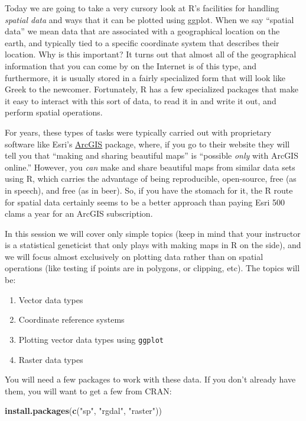 \documentclass[]{book}
\newenvironment{Shaded}{\begin{snugshade}}{\end{snugshade}}
\newcommand{\KeywordTok}[1]{\textcolor[rgb]{0.13,0.29,0.53}{\textbf{{#1}}}}
\newcommand{\StringTok}[1]{\textcolor[rgb]{0.31,0.60,0.02}{{#1}}}
\newcommand{\NormalTok}[1]{{#1}}
\providecommand{\tightlist}{%
  \setlength{\itemsep}{0pt}\setlength{\parskip}{0pt}}
\theoremstyle{definition}
\theoremstyle{definition}
\theoremstyle{remark}
\begin{document}
Today we are going to take a very cursory look at R's facilities for
handling \emph{spatial data} and ways that it can be plotted using
ggplot. When we say ``spatial data'' we mean data that are associated
with a geographical location on the earth, and typically tied to a
specific coordinate system that describes their location. Why is this
important? It turns out that almost all of the geographical information
that you can come by on the Internet is of this type, and furthermore,
it is usually stored in a fairly specialized form that will look like
Greek to the newcomer. Fortunately, R has a few specialized packages
that make it easy to interact with this sort of data, to read it in and
write it out, and perform spatial operations.

For years, these types of tasks were typically carried out with
proprietary software like Esri's
\href{https://www.arcgis.com/features/index.html}{ArcGIS} package,
where, if you go to their website they will tell you that ``making and
sharing beautiful maps'' is ``possible \emph{only} with ArcGIS online.''
However, you \emph{can} make and share beautiful maps from similar data
sets using R, which carries the advantage of being reproducible,
open-source, free (as in speech), and free (as in beer). So, if you have
the stomach for it, the R route for spatial data certainly seems to be a
better approach than paying Esri 500 clams a year for an ArcGIS
subscription.

In this session we will cover only simple topics (keep in mind that your
instructor is a statistical geneticist that only plays with making maps
in R on the side), and we will focus almost exclusively on plotting data
rather than on spatial operations (like testing if points are in
polygons, or clipping, etc). The topics will be:

\begin{enumerate}
\def\labelenumi{\arabic{enumi}.}
\tightlist
\item
  Vector data types
\item
  Coordinate reference systems
\item
  Plotting vector data types using \texttt{ggplot}
\item
  Raster data types
\end{enumerate}

You will need a few packages to work with these data. If you don't
already have them, you will want to get a few from CRAN:

\begin{Shaded}
\begin{Highlighting}[]
\KeywordTok{install.packages}\NormalTok{(}\KeywordTok{c}\NormalTok{(}\StringTok{"sp"}\NormalTok{, }\StringTok{"rgdal"}\NormalTok{, }\StringTok{"raster"}\NormalTok{))}
\end{Highlighting}
\end{Shaded}
\end{document}
